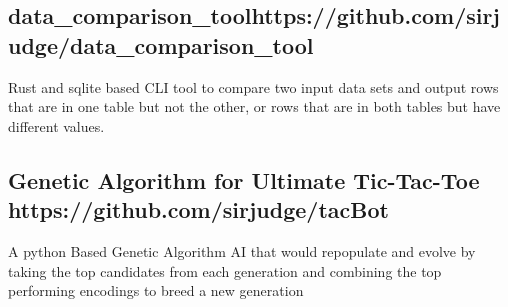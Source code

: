 \subsection{{ data_comparison_tool\hfill https://github.com/sirjudge/data_comparison_tool}}
\begin{zitemize}
\item Rust and sqlite based CLI tool to compare two input data sets and output rows that are in one table but not the other, or rows that are in both tables but have different values.
\end{zitemize}

\subsection{{ \hfill }}
\begin{zitemize}
\item
\end{zitemize}


\subsection{{ \hfill }}
\begin{zitemize}
\item
\end{zitemize}

\subsection{{Genetic Algorithm for Ultimate Tic-Tac-Toe  \hfill  https://github.com/sirjudge/tacBot }}
\begin{zitemize}
\item A python Based Genetic Algorithm AI that would repopulate and evolve by taking the top candidates from each generation and combining the top performing encodings to breed a new generation
\end{zitemize}

